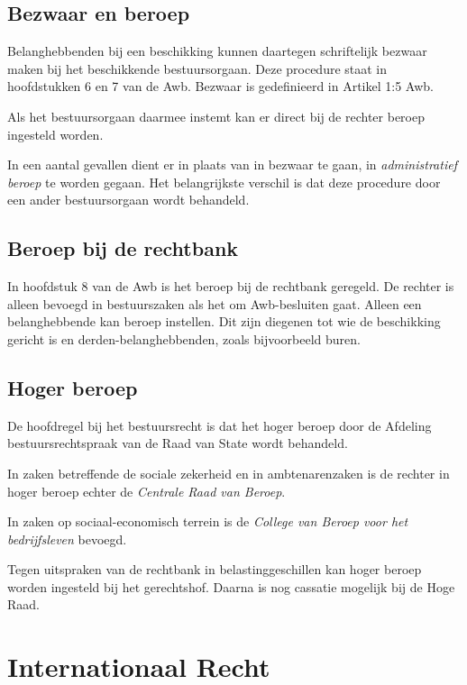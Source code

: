 \documentclass{article}
\begin{document}
\subsection{Bezwaar en beroep}

Belanghebbenden bij een beschikking kunnen daartegen schriftelijk bezwaar maken
bij het beschikkende bestuursorgaan. Deze procedure staat in hoofdstukken 6 en
7 van de Awb. Bezwaar is gedefinieerd in Artikel 1:5 Awb.

Als het bestuursorgaan daarmee instemt kan er direct bij de rechter beroep
ingesteld worden.

In een aantal gevallen dient er in plaats van in bezwaar te gaan, in
\emph{administratief beroep} te worden gegaan. Het belangrijkste verschil is
dat deze procedure door een ander bestuursorgaan wordt behandeld. 

\subsection{Beroep bij de rechtbank}

In hoofdstuk 8 van de Awb is het beroep bij de rechtbank geregeld. De rechter
is alleen bevoegd in bestuurszaken als het om Awb-besluiten gaat. Alleen een
belanghebbende kan beroep instellen. Dit zijn diegenen tot wie de beschikking
gericht is en derden-belanghebbenden, zoals bijvoorbeeld buren. 

\subsection{Hoger beroep}

De hoofdregel bij het bestuursrecht is dat het hoger beroep door de Afdeling
bestuursrechtspraak van de Raad van State wordt behandeld. 

In zaken betreffende de sociale zekerheid en in ambtenarenzaken is de rechter
in hoger beroep echter de \emph{Centrale Raad van Beroep}.

In zaken op sociaal-economisch terrein is de \emph{College van Beroep voor het
bedrijfsleven} bevoegd.

Tegen uitspraken van de rechtbank in belastinggeschillen kan hoger beroep
worden ingesteld bij het gerechtshof. Daarna is nog cassatie mogelijk bij de
Hoge Raad.


\section{Internationaal Recht} \label{h15}
\end{document}
